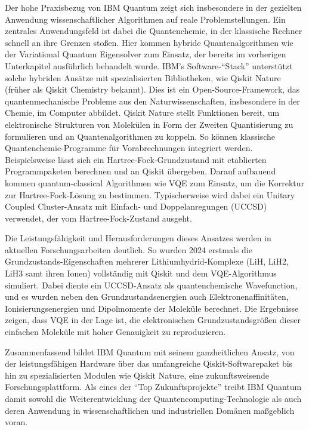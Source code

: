Der hohe Praxisbezug von IBM Quantum zeigt sich insbesondere in der gezielten Anwendung wissenschaftlicher Algorithmen auf reale Problemstellungen. Ein zentrales Anwendungsfeld ist dabei die Quantenchemie, in der klassische Rechner schnell an ihre Grenzen stoßen. Hier kommen hybride Quantenalgorithmen wie der Variational Quantum Eigensolver zum Einsatz, der bereits im vorherigen Unterkapitel ausführlich behandelt wurde. \citealp[5]{miceliQuantumComputationVisualization2018} IBM’s Software-“Stack” unterstützt solche hybriden Ansätze mit spezialisierten Bibliotheken, wie Qiskit Nature (früher als Qiskit Chemistry bekannt). Dies ist ein Open-Source-Framework, das quantenmechanische Probleme aus den Naturwissenschaften, insbesondere in der Chemie, im Computer abbildet. Qiskit Nature stellt Funktionen bereit, um elektronische Strukturen von Molekülen in Form der Zweiten Quantisierung zu formulieren und an Quantenalgorithmen zu koppeln. So können klassische Quantenchemie-Programme für Vorabrechnungen integriert werden. Beispielsweise lässt sich ein Hartree-Fock-Grundzustand mit etablierten Programmpaketen berechnen und an Qiskit übergeben. Darauf aufbauend kommen quantum-classical Algorithmen wie VQE zum Einsatz, um die Korrektur zur Hartree-Fock-Lösung zu bestimmen. Typischerweise wird dabei ein Unitary Coupled Cluster-Ansatz mit Einfach- und Doppelanregungen (UCCSD) verwendet, der vom Hartree-Fock-Zustand ausgeht. \citealp[2]{avramidisGroundStateProperty2024}

Die Leistungsfähigkeit und Herausforderungen dieses Ansatzes werden in aktuellen Forschungsarbeiten deutlich. So wurden 2024 erstmals die Grundzustands-Eigenschaften mehrerer Lithiumhydrid-Komplexe (LiH, LiH2, LiH3 samt ihren Ionen) vollständig mit Qiskit und dem VQE-Algorithmus simuliert. Dabei diente ein UCCSD-Ansatz als quantenchemische Wavefunction, und es wurden neben den Grundzustandsenergien auch Elektronenaffinitäten, Ionisierungsenergien und Dipolmomente der Moleküle berechnet. Die Ergebnisse zeigen, dass VQE in der Lage ist, die elektronischen Grundzustandsgrößen dieser einfachen Moleküle mit hoher Genauigkeit zu reproduzieren. \citealp[4]{avramidisGroundStateProperty2024}

Zusammenfassend bildet IBM Quantum mit seinem ganzheitlichen Ansatz, von der leistungsfähigen Hardware über das umfangreiche Qiskit-Softwarepaket bis hin zu spezialisierten Modulen wie Qiskit Nature, eine zukunftsweisende Forschungsplattform. Als eines der “Top Zukunftsprojekte” treibt IBM Quantum damit sowohl die Weiterentwicklung der Quantencomputing-Technologie als auch deren Anwendung in wissenschaftlichen und industriellen Domänen maßgeblich voran.

